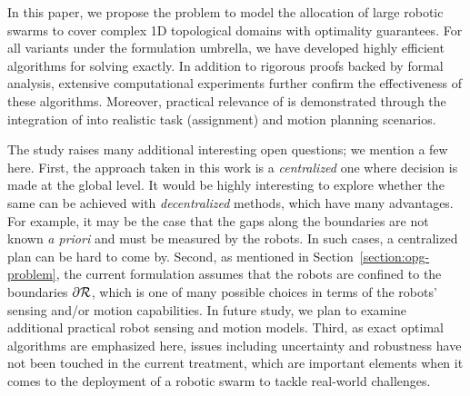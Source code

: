 In this paper, we propose the \opg problem to model the allocation of 
large robotic swarms to cover complex 1D topological domains with 
optimality guarantees. For all variants under the \opg formulation 
umbrella, we have developed highly efficient algorithms for solving 
\opg exactly. In addition to rigorous proofs backed by formal analysis, 
extensive computational experiments further confirm the effectiveness of 
these algorithms. Moreover, practical relevance of \opg is demonstrated 
through the integration of \opg into realistic task (assignment) and motion 
planning scenarios. 

The study raises many additional interesting open questions; we mention 
a few here. 
%
First, the approach taken in this work is a {\em centralized} one where 
decision is made at the global level. It would be highly interesting to 
explore whether the same can be achieved with {\em decentralized} methods,
which have many advantages. For example, it may be the case that the 
gaps along the boundaries are not known {\em a priori} and must be measured
by the robots. In such cases, a centralized plan can be hard to come by. 
%
Second, as mentioned in Section~\ref{section:opg-problem}, the 
current \opg formulation assumes that the robots are confined to the 
boundaries $\partial \mathcal R$, which is one of many possible choices 
in terms of the robots' sensing and/or motion capabilities. In future study,
we plan to examine additional practical robot sensing and motion models. 
%
Third, as exact optimal algorithms are emphasized here, issues including 
uncertainty and robustness have not been touched in the current treatment, 
which are important elements when it comes to the deployment of a robotic 
swarm to tackle real-world challenges. 